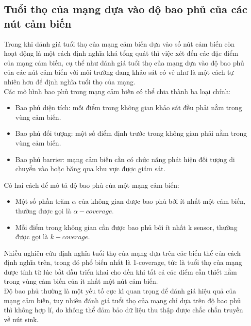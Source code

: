 \subsection{Tuổi thọ của mạng dựa vào độ bao phủ của các nút cảm biến}
Trong khi đánh giá tuổi thọ của mạng cảm biến dựa vào số nút cảm biến còn hoạt động là một cách định nghĩa khá tổng quát thì việc xét đến các đặc điểm của mạng cảm biến, cụ thể như đánh giá tuổi thọ của mạng dựa vào độ bao phủ của các nút cảm biến với môi trường đang khảo sát có vẻ như là một cách tự nhiên hơn để định nghĩa tuổi thọ của mạng.
\\Các mô hình bao phủ trong mạng cảm biến có thể chia thành ba loại chính:
\begin{itemize}
    \item Bao phủ diện tích: mỗi điểm trong không gian khảo sát đều phải nằm trong vùng cảm biến.
    \item Bao phủ đối tượng: một số điểm định trước trong không gian phải nằm trong vùng cảm biến.
    \item Bao phủ barrier: mạng cảm biến cần có chức năng phát hiện đối tượng di chuyển vào hoặc băng qua khu vực được giám sát.
\end{itemize}
Có hai cách để mô tả độ bao phủ của một mạng cảm biến:
\begin{itemize}
    \item Một số phần trăm $\alpha$ của không gian được bao phủ bởi ít nhất một cảm biến, thường được gọi là $\alpha-coverage$.
    \item Mỗi điểm trong không gian cần được bao phủ bởi ít nhất k sensor, thường được gọi là $k-coverage$.
\end{itemize}
Nhiều nghiên cứu định nghĩa tuổi thọ của mạng dựa trên các biến thể của cách định nghĩa trên, trong đó phổ biến nhất là 1-coverage, tức là tuổi thọ của mạng được tính từ lúc bắt đầu triển khai cho đến khi tất cả các điểm cần thiết nằm trong vùng cảm biến của ít nhất một nút cảm biến.
\\Độ bao phủ thường là một yếu tố cực kì quan trọng để đánh giá hiệu quả của mạng cảm biến, tuy nhiên đánh giá tuổi thọ của mạng chỉ dựa trên độ bao phủ thì không hợp lí, do không thể đảm bảo dữ liệu thu thập được chắc chắn truyền về nút sink.
